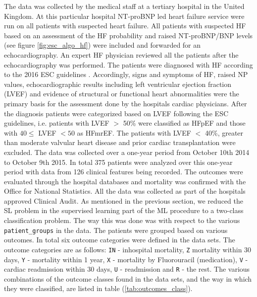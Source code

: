\documentclass[../thesis.tex]{subfiles}
\begin{document}
\indent The data was collected by the medical staff at a tertiary hospital in the United Kingdom. At this particular hospital NT-proBNP led heart failure service were run on all patients with suspected heart failure. All patients with suspected HF based on an assessment of the HF probability and raised NT-proBNP/BNP levels (see figure \ref{fig:esc_algo_hf}) were included and forwarded for an echocardiography. An expert HF physician reviewed all the patients after the echocardiography was performed. The patients were diagnosed with HF according to the 2016 ESC guidelines \citep{ponikowski2016}. Accordingly, signs and symptoms of HF, raised NP values, echocardiographic results including left ventricular ejection fraction (LVEF) and evidence of structural or functional heart abnormalities were the primary basis for the assessment done by the hospitals cardiac physicians. After the diagnosis patients were categorized based on LVEF following the ESC guidelines, i.e. patients with LVEF $>$ 50\% were classified as HFpEF and those with $40 \leq$ LVEF $< 50$ as HFmrEF. The patients with LVEF $<$ 40\%, greater than moderate valvular heart disease and prior cardiac transplantation were excluded. The data was collected over a one-year period from October 10th 2014 to October 9th 2015. In total 375 patients were analyzed over this one-year period with data from 126 clinical features being recorded. The outcomes were evaluated through the hospital databases and mortality was confirmed with the Office for National Statistics. All the data was collected as part of the hospitals approved Clinical Audit. As mentioned in the previous section, we reduced the SL problem in the supervised learning part of the ML procedure to a two-class classification problem. The way this was done was with respect to the various \texttt{patient\_groups} in the data. The patients were grouped based on various \noindent outcomes. In total six outcome categories were  defined in the data sets. The outcome categories are as follows: \texttt{IN} - inhospital mortality, \texttt{Z} \noindent mortality within 30 days, \texttt{Y} - mortality within 1 year, \texttt{X} - mortality by Fluorouracil (medication), \texttt{V} - cardiac readmission within 30 days, \texttt{U} - readmission and \texttt{R} - the rest. The various combinations of the outcome classes found in the data sets, and the way in which they were classified, are listed in table (\ref{tab:outcomes_class}).\\


\end{document}
